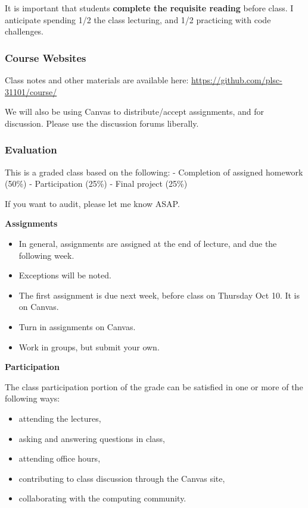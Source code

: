 \documentclass[]{book}
\providecommand{\tightlist}{%
  \setlength{\itemsep}{0pt}\setlength{\parskip}{0pt}}
\begin{document}
It is important that students \textbf{complete the requisite reading}
before class. I anticipate spending 1/2 the class lecturing, and 1/2
practicing with code challenges.

\subsubsection*{Course Websites}\label{course-websites}

Class notes and other materials are available here:
\url{https://github.com/plsc-31101/course/}

We will also be using Canvas to distribute/accept assignments, and for
discussion. Please use the discussion forums liberally.

\subsubsection*{Evaluation}\label{evaluation}

This is a graded class based on the following: - Completion of assigned
homework (50\%) - Participation (25\%) - Final project (25\%)

If you want to audit, please let me know ASAP.

\textbf{Assignments}

\begin{itemize}
\tightlist
\item
  In general, assignments are assigned at the end of lecture, and due
  the following week.
\item
  Exceptions will be noted.
\item
  The first assignment is due next week, before class on Thursday Oct
  10. It is on Canvas.
\item
  Turn in assignments on Canvas.
\item
  Work in groups, but submit your own.
\end{itemize}

\textbf{Participation}

The class participation portion of the grade can be satisfied in one or
more of the following ways:

\begin{itemize}
\tightlist
\item
  attending the lectures,
\item
  asking and answering questions in class,
\item
  attending office hours,
\item
  contributing to class discussion through the Canvas site,
\item
  collaborating with the computing community.
\end{itemize}
\end{document}
